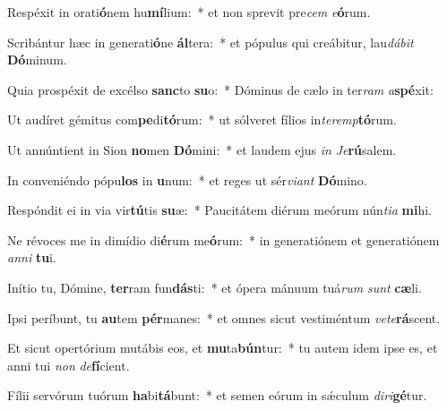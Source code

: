 \item Respéxit in orati\textbf{ó}nem hu\textbf{mí}lium:~* et non sprevit pre\textit{cem} \textit{e}\textbf{ó}rum.
\item Scribántur hæc in generati\textbf{ó}ne \textbf{ál}tera:~* et pópulus qui creábitur, lau\textit{dá}\textit{bit} \textbf{Dó}minum.
\item Quia prospéxit de excélso \textbf{sanc}to \textbf{su}o:~* Dóminus de cælo in ter\textit{ram} \textit{a}\textbf{spé}xit:
\item Ut audíret gémitus com\textbf{pe}di\textbf{tó}rum:~* ut sólveret fílios in\textit{ter}\textit{emp}\textbf{tó}rum.
\item Ut annúntient in Sion \textbf{no}men \textbf{Dó}mini:~* et laudem ejus \textit{in} \textit{Je}\textbf{rú}salem.
\item In conveniéndo pópu\textbf{los} in \textbf{u}num:~* et reges ut sér\textit{vi}\textit{ant} \textbf{Dó}mino.
\item Respóndit ei in via vir\textbf{tú}tis \textbf{su}æ:~* Paucitátem diérum meórum nún\textit{ti}\textit{a} \textbf{mi}hi.
\item Ne révoces me in dimídio di\textbf{é}rum me\textbf{ó}rum:~* in generatiónem et generatiónem \textit{an}\textit{ni} \textbf{tu}i.
\item Inítio tu, Dómine, \textbf{ter}ram fun\textbf{dás}ti:~* et ópera mánuum tuá\textit{rum} \textit{sunt} \textbf{cæ}li.
\item Ipsi períbunt, tu \textbf{au}tem \textbf{pér}manes:~* et omnes sicut vestiméntum \textit{ve}\textit{te}\textbf{rá}scent.
\item Et sicut opertórium mutábis eos, et \textbf{mu}ta\textbf{bún}tur:~* tu autem idem ipse es, et anni tui \textit{non} \textit{de}\textbf{fí}cient.
\item Fílii servórum tuórum \textbf{ha}bi\textbf{tá}bunt:~* et semen eórum in sǽculum \textit{di}\textit{ri}\textbf{gé}tur.
